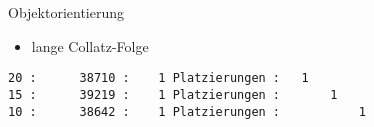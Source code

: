 \begin{slide}{Objektorientierung}

\begin{itemize}
\item lange Collatz-Folge
\end{itemize}

\begin{verbatim}
20 :      38710 :    1 Platzierungen :   1                                    
15 :      39219 :    1 Platzierungen :       1                                
10 :      38642 :    1 Platzierungen :           1                            
\end{verbatim}

\end{slide}

